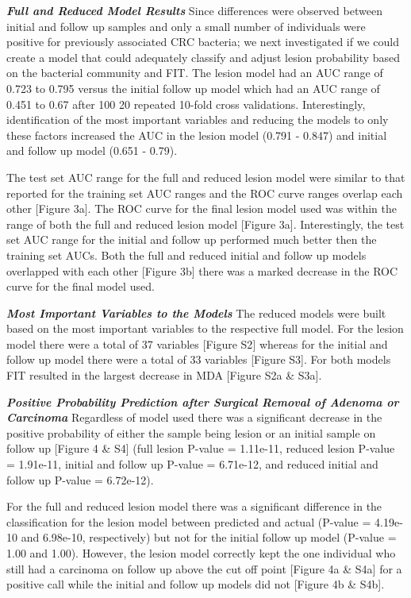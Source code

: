 \documentclass[12pt,]{article}
\begin{document}
\textbf{\emph{Full and Reduced Model Results}} Since differences were
observed between initial and follow up samples and only a small number
of individuals were positive for previously associated CRC bacteria; we
next investigated if we could create a model that could adequately
classify and adjust lesion probability based on the bacterial community
and FIT. The lesion model had an AUC range of 0.723 to 0.795 versus the
initial follow up model which had an AUC range of 0.451 to 0.67 after
100 20 repeated 10-fold cross validations. Interestingly, identification
of the most important variables and reducing the models to only these
factors increased the AUC in the lesion model (0.791 - 0.847) and
initial and follow up model (0.651 - 0.79).

The test set AUC range for the full and reduced lesion model were
similar to that reported for the training set AUC ranges and the ROC
curve ranges overlap each other {[}Figure 3a{]}. The ROC curve for the
final lesion model used was within the range of both the full and
reduced lesion model {[}Figure 3a{]}. Interestingly, the test set AUC
range for the initial and follow up performed much better then the
training set AUCs. Both the full and reduced initial and follow up
models overlapped with each other {[}Figure 3b{]} there was a marked
decrease in the ROC curve for the final model used.

\textbf{\emph{Most Important Variables to the Models}} The reduced
models were built based on the most important variables to the
respective full model. For the lesion model there were a total of 37
variables {[}Figure S2{]} whereas for the initial and follow up model
there were a total of 33 variables {[}Figure S3{]}. For both models FIT
resulted in the largest decrease in MDA {[}Figure S2a \& S3a{]}.

\textbf{\emph{Positive Probability Prediction after Surgical Removal of
Adenoma or Carcinoma}} Regardless of model used there was a significant
decrease in the positive probability of either the sample being lesion
or an initial sample on follow up {[}Figure 4 \& S4{]} (full lesion
P-value = 1.11e-11, reduced lesion P-value = 1.91e-11, initial and
follow up P-value = 6.71e-12, and reduced initial and follow up P-value
= 6.72e-12).

For the full and reduced lesion model there was a significant difference
in the classification for the lesion model between predicted and actual
(P-value = 4.19e-10 and 6.98e-10, respectively) but not for the initial
follow up model (P-value = 1.00 and 1.00). However, the lesion model
correctly kept the one individual who still had a carcinoma on follow up
above the cut off point {[}Figure 4a \& S4a{]} for a positive call while
the initial and follow up models did not {[}Figure 4b \& S4b{]}.
\end{document}
